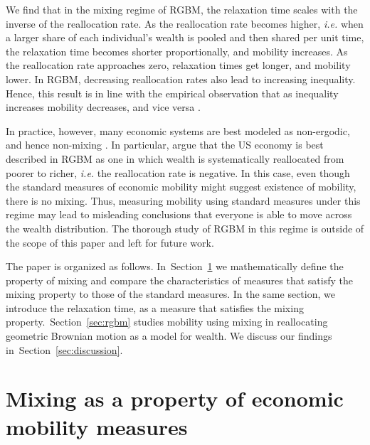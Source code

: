 \documentclass[11pt]{article}
\newcommand{\Sref}[1]{Section~\ref{sec:#1}}
\newcommand{\ie}{{\it i.e.}\xspace}
\numberwithin{equation}{section}
\begin{document}
We find that in the mixing regime of RGBM, the relaxation time scales with the inverse of the reallocation rate. As the reallocation rate becomes higher, \ie when a larger share of each individual's wealth is pooled and then shared per unit time, the relaxation time becomes shorter proportionally, and mobility increases. As the reallocation rate approaches zero, relaxation times get longer, and mobility lower. In RGBM, decreasing reallocation rates also lead to increasing inequality. Hence, this result is in line with the empirical observation that as inequality increases mobility decreases, and vice versa \citep{corak2013}. %

In practice, however, many economic systems are best modeled as non-ergodic, and hence non-mixing \citep{Peters2019b}. In particular, \citet{BermanPetersAdamou2019} argue that the US economy is best described in RGBM as one in which wealth is systematically reallocated from poorer to richer, \ie the reallocation rate is negative. In this case, even though the standard measures of economic mobility might suggest existence of mobility, there is no mixing. Thus, measuring mobility using standard measures under this regime may lead to misleading conclusions that everyone is able to move across the wealth distribution. The thorough study of RGBM in this regime is outside of the scope of this paper and left for future work.

The paper is organized as follows. In~\Sref{mixing-time} we mathematically define the property of mixing and compare the characteristics of measures that satisfy the mixing property to those of the standard measures. In the same section, we introduce the relaxation time, as a measure that satisfies the mixing property.~\Sref{rgbm} studies mobility using mixing in reallocating geometric Brownian motion as a model for wealth. We discuss our findings in~\Sref{discussion}.

\section{Mixing as a property of economic mobility measures}
\label{sec:mixing-time}
\end{document}
